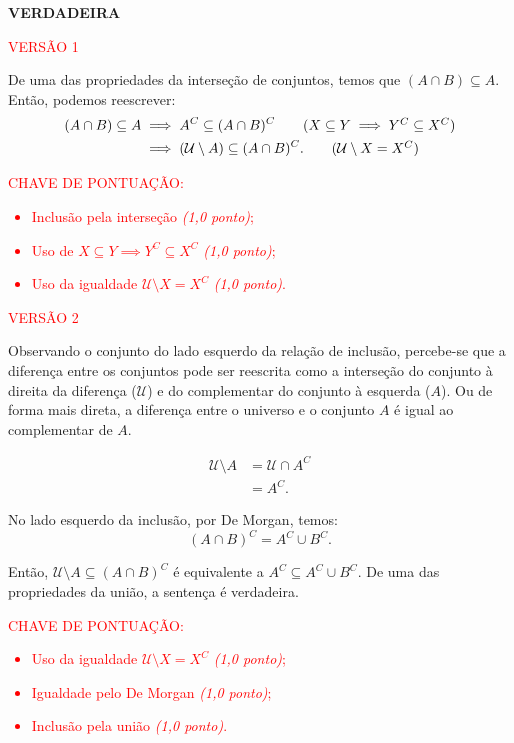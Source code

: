 \textbf{VERDADEIRA}

\textcolor{red}{ VERSÃO 1 } %

De uma das propriedades da interseção de conjuntos, temos que $(A \cap B)
    \subseteq A$. Então, podemos reescrever:
\begin{align*}
    (A \cap B) \subseteq A & \implies A^{C} \subseteq (A \cap B)^{C} \tag{$X \subseteq Y \implies Y^C \subseteq X^C$}            \\
                           & \implies (\mathcal{U} \setminus A) \subseteq (A \cap B)^{C}. \tag{$\mathcal{U} \setminus X= X^{C}$}
\end{align*}

\bigskip

\textcolor{red}{CHAVE DE PONTUAÇÃO:
    \begin{itemize}
        \item  Inclusão pela interseção \emph{(1,0 ponto)};
        \item Uso de $X \subseteq Y \implies Y^C \subseteq X^C$ \emph{(1,0 ponto)};
        \item  Uso da igualdade $\mathcal{U} \setminus X= X^{C}$ \emph{(1,0 ponto)}.
    \end{itemize} }

\bigskip

\textcolor{red}{ VERSÃO 2 } %

Observando o conjunto do lado esquerdo da relação de inclusão, percebe-se que a
diferença entre os conjuntos pode ser reescrita como a interseção do conjunto à
direita da diferença ($\mathcal{U}$) e do complementar do conjunto à esquerda
($A$). Ou de forma mais direta, a diferença entre o universo e o conjunto $A$ é
igual ao complementar de $A$.

\begin{align*}
    \mathcal{U} \setminus A & = \mathcal{U} \cap A^{C} \\
                            & = A^{C}.
\end{align*}

No lado esquerdo da inclusão, por De Morgan, temos: $$(A \cap B)^{C} = A^{C}
    \cup B^{C}.$$

Então, $ \mathcal{U} \setminus A \subseteq (A \cap B)^{C}$ é equivalente a
$A^{C} \subseteq A^{C} \cup B^{C}$. De uma das propriedades da união, a
sentença é verdadeira.

\bigskip


\bigskip

\textcolor{red}{CHAVE DE PONTUAÇÃO:
    \begin{itemize}
        \item  Uso da igualdade $\mathcal{U} \setminus X= X^{C}$ \emph{(1,0 ponto)};
        \item  Igualdade pelo De Morgan \emph{(1,0 ponto)};
        \item  Inclusão pela união \emph{(1,0 ponto)}.
    \end{itemize} }